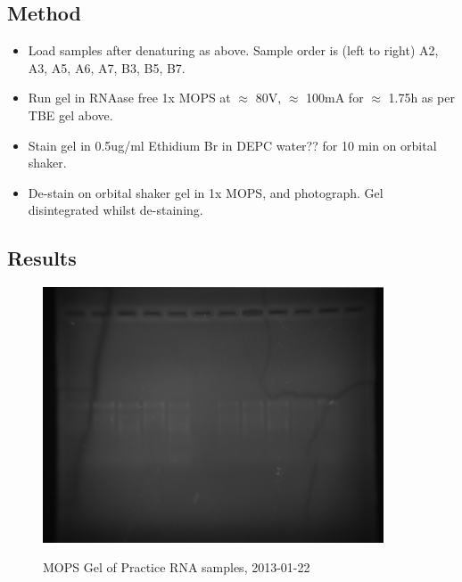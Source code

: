 \documentclass[12pt,a4paper]{book}
\begin{document}
    \subsection*{Method}
      \begin{itemize} \itemsep1pt \parskip0pt 
        \item Load samples after denaturing as above. Sample order is (left to right) A2, A3, A5, A6, A7, B3, B5, B7.
        \item Run gel in RNAase free 1x MOPS at $\approx$ 80V, $\approx$ 100mA for $\approx$ 1.75h as per TBE gel above.
        \item Stain gel in 0.5ug/ml Ethidium Br in DEPC water?? for 10 min on orbital shaker.
        \item De-stain on orbital shaker gel in 1x MOPS, and photograph. Gel disintegrated whilst de-staining.
      \end{itemize}

    \subsection*{Results}
      \begin{figure}[h!]
        \caption{MOPS Gel of Practice RNA samples, 2013-01-22}
        \centering
          \includegraphics[width=0.9\textwidth]{./2013-01/20130122-PracticeRNADenaturedMOPS}
        \label{fig:20130122-PracticeRNADenaturedMOPS}
      \end{figure}
\end{document}
